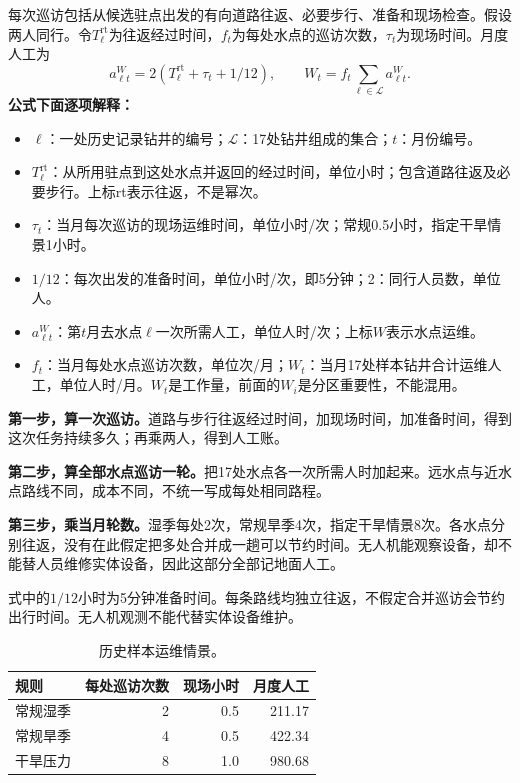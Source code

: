 \documentclass[12pt,a4paper]{article}
\numberwithin{equation}{section}
\begin{document}
每次巡访包括从候选驻点出发的有向道路往返、必要步行、准备和现场检查。假设两人同行。令$T_\ell^{\mathrm{rt}}$为往返经过时间，$f_t$为每处水点的巡访次数，$\tau_t$为现场时间。月度人工为
\begin{equation}
a_{\ell t}^{W}=2(T_\ell^{\mathrm{rt}}+\tau_t+1/12),\qquad
W_t=f_t\sum_{\ell\in\mathcal L}a_{\ell t}^{W}.
\label{eq:water}
\end{equation}
\noindent\textbf{公式下面逐项解释：}
\begin{itemize}
\item $\ell$：一处历史记录钻井的编号；$\mathcal L$：17处钻井组成的集合；$t$：月份编号。
\item $T_\ell^{\mathrm{rt}}$：从所用驻点到这处水点并返回的经过时间，单位小时；包含道路往返及必要步行。上标rt表示往返，不是幂次。
\item $\tau_t$：当月每次巡访的现场运维时间，单位小时/次；常规0.5小时，指定干旱情景1小时。
\item $1/12$：每次出发的准备时间，单位小时/次，即5分钟；2：同行人员数，单位人。
\item $a_{\ell t}^{W}$：第$t$月去水点$\ell$一次所需人工，单位人时/次；上标$W$表示水点运维。
\item $f_t$：当月每处水点巡访次数，单位次/月；$W_t$：当月17处样本钻井合计运维人工，单位人时/月。$W_t$是工作量，前面的$W_i$是分区重要性，不能混用。
\end{itemize}
\noindent\textbf{第一步，算一次巡访。}道路与步行往返经过时间，加现场时间，加准备时间，得到这次任务持续多久；再乘两人，得到人工账。

\noindent\textbf{第二步，算全部水点巡访一轮。}把17处水点各一次所需人时加起来。远水点与近水点路线不同，成本不同，不统一写成每处相同路程。

\noindent\textbf{第三步，乘当月轮数。}湿季每处2次，常规旱季4次，指定干旱情景8次。各水点分别往返，没有在此假定把多处合并成一趟可以节约时间。无人机能观察设备，却不能替人员维修实体设备，因此这部分全部记地面人工。

式中的$1/12$小时为5分钟准备时间。每条路线均独立往返，不假定合并巡访会节约出行时间。无人机观测不能代替实体设备维护。

\begin{table}[H]
\centering\normalsize
\caption{历史样本运维情景。}
\label{tab:water}
\begin{tabular}{lrrr}
\toprule
规则 & 每处巡访次数 & 现场小时 & 月度人工 \\
\midrule
常规湿季 & 2 & 0.5 & 211.17 \\
常规旱季 & 4 & 0.5 & 422.34 \\
干旱压力 & 8 & 1.0 & 980.68 \\
\bottomrule
\end{tabular}
\end{table}
\end{document}
